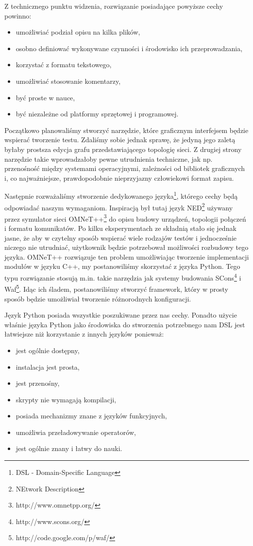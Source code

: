 \documentclass[00-praca-magisterska.tex]{subfiles}
\begin{document}
Z technicznego punktu widzenia, rozwiązanie posiadające powyższe cechy
powinno:
\begin{itemize}
\item umożliwiać podział opisu na kilka plików,
\item osobno definiować wykonywane czynności i środowisko ich przeprowadzania,
\item korzystać z formatu tekstowego,
\item umożliwiać stosowanie komentarzy,
\item być proste w nauce,
\item być niezależne od platformy sprzętowej i programowej.
\end{itemize}

Początkowo planowaliśmy stworzyć narzędzie, które graficznym interfejsem
będzie wspierać tworzenie testu. Zdaliśmy sobie jednak sprawę, że jedyną jego
zaletą byłaby prostsza edycja grafu przedstawiającego topologię sieci. Z
drugiej strony narzędzie takie wprowadzałoby pewne utrudnienia techniczne, jak
np. przenośność między systemami operacyjnymi, zależności od bibliotek
graficznych i, co najważniejsze, prawdopodobnie nieprzyjazny człowiekowi
format zapisu.

Następnie rozważaliśmy stworzenie dedykowanego języka\footnote{DSL -
Domain-Specific Language}, którego cechy będą odpowiadać naszym wymaganiom.
Inspiracją był tutaj język NED\footnote{NEtwork Description} używany przez
symulator sieci OMNeT++\footnote{http://www.omnetpp.org/} do opisu budowy
urządzeń, topologii połączeń i formatu komunikatów. Po kilku eksperymentach ze
składnią stało się jednak jasne, że aby w czytelny sposób wspierać wiele
rodzajów testów i jednocześnie niczego nie utrudniać, użytkownik będzie
potrzebował możliwości rozbudowy tego języka. OMNeT++ rozwiązuje ten problem
umożliwiając tworzenie implementacji modułów w języku C++, my postanowiliśmy
skorzystać z języka Python. Tego typu rozwiązanie stosują m.in. takie narzędzia
jak systemy budowania SCons\footnote{http://www.scons.org/} i
Waf\footnote{http://code.google.com/p/waf/}.  Idąc ich śladem, postanowiliśmy
stworzyć framework, który w prosty sposób będzie umożliwiał tworzenie
różnorodnych konfiguracji.

Język Python posiada wszystkie poszukiwane przez nas cechy. Ponadto użycie właśnie
języka Python jako środowiska do stworzenia potrzebnego nam DSL jest łatwiejsze niż
korzystanie z innych języków ponieważ:
\begin{itemize}
\item jest ogólnie dostępny,
\item instalacja jest prosta,
\item jest przenośny,
\item skrypty nie wymagają kompilacji,
\item posiada mechanizmy znane z języków funkcyjnych,
\item umożliwia przeładowywanie operatorów,
\item jest ogólnie znany i łatwy do nauki.
\end{itemize}
\end{document}
